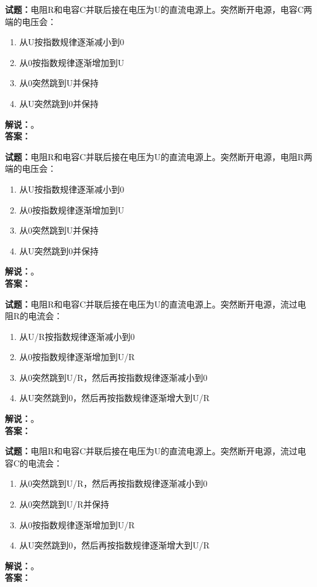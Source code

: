 \documentclass{ctexbook}
\begin{document}
\bigskip




\noindent\textbf{试题：}电阻R和电容C并联后接在电压为U的直流电源上。突然断开电源，电容C两端的电压会：
\begin{enumerate}[leftmargin=3em]
\item 从U按指数规律逐渐减小到0
\item 从0按指数规律逐渐增加到U
\item 从0突然跳到U并保持
\item 从U突然跳到0并保持
\end{enumerate}
\noindent\textbf{解说：}\textbf{}。\\\noindent\textbf{答案：}

\bigskip




\noindent\textbf{试题：}电阻R和电容C并联后接在电压为U的直流电源上。突然断开电源，电阻R两端的电压会：
\begin{enumerate}[leftmargin=3em]
\item 从U按指数规律逐渐减小到0
\item 从0按指数规律逐渐增加到U
\item 从0突然跳到U并保持
\item 从U突然跳到0并保持
\end{enumerate}
\noindent\textbf{解说：}\textbf{}。\\\noindent\textbf{答案：}

\bigskip




\noindent\textbf{试题：}电阻R和电容C并联后接在电压为U的直流电源上。突然断开电源，流过电阻R的电流会：
\begin{enumerate}[leftmargin=3em]
\item 从U/R按指数规律逐渐减小到0
\item 从0按指数规律逐渐增加到U/R
\item 从0突然跳到U/R，然后再按指数规律逐渐减小到0
\item 从U突然跳到0，然后再按指数规律逐渐增大到U/R
\end{enumerate}
\noindent\textbf{解说：}\textbf{}。\\\noindent\textbf{答案：}

\bigskip




\noindent\textbf{试题：}电阻R和电容C并联后接在电压为U的直流电源上。突然断开电源，流过电容C的电流会：
\begin{enumerate}[leftmargin=3em]
\item 从0突然跳到U/R，然后再按指数规律逐渐减小到0
\item 从0突然跳到U/R并保持
\item 从0按指数规律逐渐增加到U/R
\item 从U突然跳到0，然后再按指数规律逐渐增大到U/R
\end{enumerate}
\noindent\textbf{解说：}\textbf{}。\\\noindent\textbf{答案：}
\end{document}
